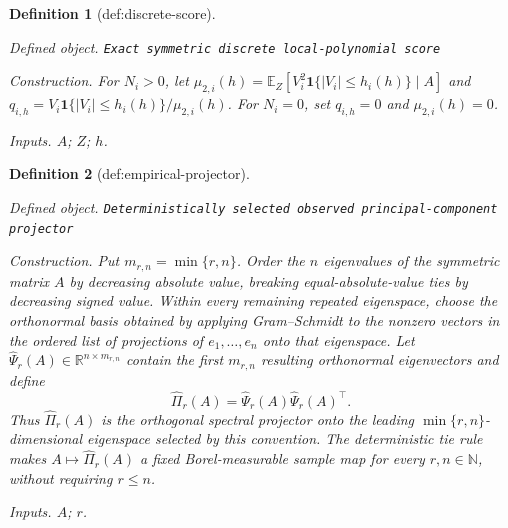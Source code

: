 \documentclass{article}
\newtheorem{definition}{Definition}
\begin{document}
\begin{definition}[def:discrete-score]\label{def:discrete-score}
\par\smallskip\noindent\emph{Defined object.} \texttt{Exact symmetric discrete local-\allowbreak{}polynomial score}
\par\smallskip\noindent\emph{Construction.} For \(N_i>0\), let \(\mu_{2,i}(h)=\mathbb E_Z[V_i^2\mathbf 1\{|V_i|\le h_i(h)\}\mid A]\) and \(q_{i,h}=V_i\mathbf 1\{|V_i|\le h_i(h)\}/\mu_{2,i}(h)\). For \(N_i=0\), set \(q_{i,h}=0\) and \(\mu_{2,i}(h)=0\).
\par\smallskip\noindent\emph{Inputs.} \(A\); \(Z\); \(h\).
\end{definition}

\begin{definition}[def:empirical-projector]\label{def:empirical-projector}
\par\smallskip\noindent\emph{Defined object.} \texttt{Deterministically selected observed principal-\allowbreak{}component projector}
\par\smallskip\noindent\emph{Construction.} Put \(m_{r,n}=\min\{r,n\}\).  Order the \(n\) eigenvalues of the symmetric matrix \(A\) by decreasing absolute value, breaking equal-absolute-value ties by decreasing signed value.  Within every remaining repeated eigenspace, choose the orthonormal basis obtained by applying Gram--Schmidt to the nonzero vectors in the ordered list of projections of \(e_1,\ldots,e_n\) onto that eigenspace.  Let \(\widehat\Psi_r(A)\in\mathbb R^{n\times m_{r,n}}\) contain the first \(m_{r,n}\) resulting orthonormal eigenvectors and define
\[
 \widehat\Pi_r(A)=\widehat\Psi_r(A)\widehat\Psi_r(A)^\top.
\]
Thus \(\widehat\Pi_r(A)\) is the orthogonal spectral projector onto the leading \(\min\{r,n\}\)-dimensional eigenspace selected by this convention.  The deterministic tie rule makes \(A\mapsto\widehat\Pi_r(A)\) a fixed Borel-measurable sample map for every \(r,n\in\mathbb N\), without requiring \(r\leq n\).
\par\smallskip\noindent\emph{Inputs.} \(A\); \(r\).
\end{definition}
\end{document}
